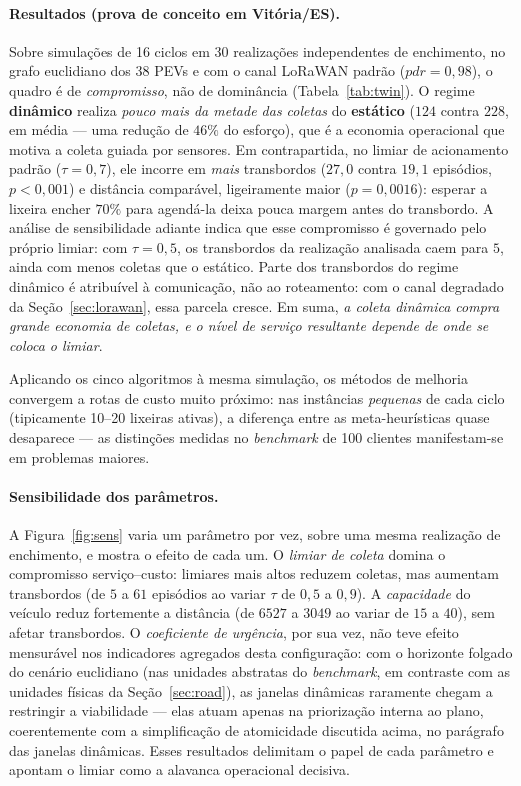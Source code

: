 \documentclass[12pt, a4paper]{article}
\begin{document}
\paragraph{Resultados (prova de conceito em Vitória/ES).} Sobre simulações de 16 ciclos em $30$ realizações independentes de enchimento, no grafo euclidiano dos 38 PEVs e com o canal LoRaWAN padrão ($\mathit{pdr}=0{,}98$), o quadro é de \emph{compromisso}, não de dominância (Tabela~\ref{tab:twin}). O regime \textbf{dinâmico} realiza \emph{pouco mais da metade das coletas} do \textbf{estático} ($124$ contra $228$, em média --- uma redução de $46\%$ do esforço), que é a economia operacional que motiva a coleta guiada por sensores. Em contrapartida, no limiar de acionamento padrão ($\tau=0{,}7$), ele incorre em \emph{mais} transbordos ($27{,}0$ contra $19{,}1$ episódios, $p<0{,}001$) e distância comparável, ligeiramente maior ($p=0{,}0016$): esperar a lixeira encher $70\%$ para agendá-la deixa pouca margem antes do transbordo. A análise de sensibilidade adiante indica que esse compromisso é governado pelo próprio limiar: com $\tau=0{,}5$, os transbordos da realização analisada caem para $5$, ainda com menos coletas que o estático. Parte dos transbordos do regime dinâmico é atribuível à comunicação, não ao roteamento: com o canal degradado da Seção~\ref{sec:lorawan}, essa parcela cresce. Em suma, \emph{a coleta dinâmica compra grande economia de coletas, e o nível de serviço resultante depende de onde se coloca o limiar}.

Aplicando os cinco algoritmos à mesma simulação, os métodos de melhoria convergem a rotas de custo muito próximo: nas instâncias \emph{pequenas} de cada ciclo (tipicamente 10--20 lixeiras ativas), a diferença entre as meta-heurísticas quase desaparece --- as distinções medidas no \textit{benchmark} de 100 clientes manifestam-se em problemas maiores.



\paragraph{Sensibilidade dos parâmetros.} A Figura~\ref{fig:sens} varia um parâmetro por vez, sobre uma mesma realização de enchimento, e mostra o efeito de cada um. O \emph{limiar de coleta} domina o compromisso serviço--custo: limiares mais altos reduzem coletas, mas aumentam transbordos (de $5$ a $61$ episódios ao variar $\tau$ de $0{,}5$ a $0{,}9$). A \emph{capacidade} do veículo reduz fortemente a distância (de $6527$ a $3049$ ao variar de $15$ a $40$), sem afetar transbordos. O \emph{coeficiente de urgência}, por sua vez, não teve efeito mensurável nos indicadores agregados desta configuração: com o horizonte folgado do cenário euclidiano (nas unidades abstratas do \textit{benchmark}, em contraste com as unidades físicas da Seção~\ref{sec:road}), as janelas dinâmicas raramente chegam a restringir a viabilidade --- elas atuam apenas na priorização interna ao plano, coerentemente com a simplificação de atomicidade discutida acima, no parágrafo das janelas dinâmicas. Esses resultados delimitam o papel de cada parâmetro e apontam o limiar como a alavanca operacional decisiva.
\end{document}
